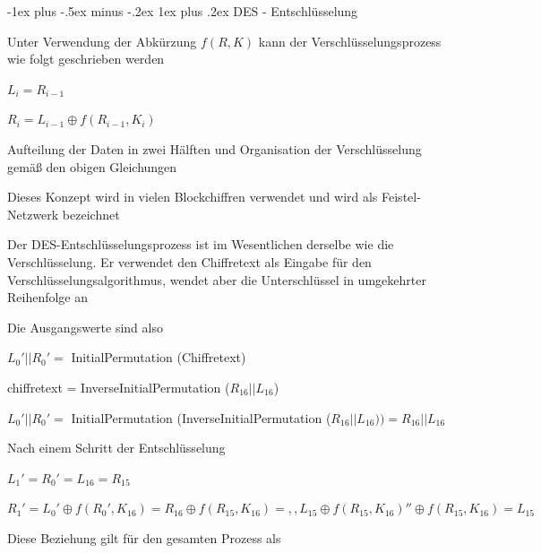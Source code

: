 \documentclass[a4paper]{article}
\makeatletter
\renewcommand{\subsubsection}{\@startsection{subsubsection}{3}{0mm}%
 {-1ex plus -.5ex minus -.2ex}%
 {1ex plus .2ex}%
 {\normalfont\small\bfseries}}
\makeatother
\begin{document}
\begin{multicols}{3}
      \subsubsection{DES - Entschlüsselung}
      \begin{itemize*}
            \item Unter Verwendung der Abkürzung $f(R, K)$ kann der Verschlüsselungsprozess wie folgt geschrieben werden
            \begin{itemize*}
                  \item $L_i = R_{i-1}$
                  \item $R_i = L_{i-1}\oplus f(R_{i-1}, K_i)$
                  \item Aufteilung der Daten in zwei Hälften und Organisation der Verschlüsselung gemäß den obigen Gleichungen
                  \item Dieses Konzept wird in vielen Blockchiffren verwendet und wird als Feistel-Netzwerk bezeichnet
            \end{itemize*}
            \item Der DES-Entschlüsselungsprozess ist im Wesentlichen derselbe wie die Verschlüsselung. Er verwendet den Chiffretext als Eingabe für den Verschlüsselungsalgorithmus, wendet aber die Unterschlüssel in umgekehrter Reihenfolge an
            \item Die Ausgangswerte sind also
            \begin{itemize*}
                  \item $L_0' || R_0' =$ InitialPermutation (Chiffretext)
                  \item chiffretext = InverseInitialPermutation ($R_{16} || L_{16}$)
                  \item $L_0' || R_0' =$ InitialPermutation (InverseInitialPermutation ($R_{16}|| L_{16}))=R_{16}|| L_{16}$
            \end{itemize*}
            \item Nach einem Schritt der Entschlüsselung
            \begin{itemize*}
                  \item $L_1' = R_0' = L_{16} = R_{15}$
                  \item $R_1' = L_0' \oplus f(R_0', K_{16})=R_{16}\oplus f(R_{15},K_{16})=,,L_{15}\oplus f(R_{15},K_{16})''\oplus f(R_{15},K_{16}) =L_{15}$
            \end{itemize*}
            \item Diese Beziehung gilt für den gesamten Prozess als

\end{itemize*}
\end{multicols}
\end{document}

